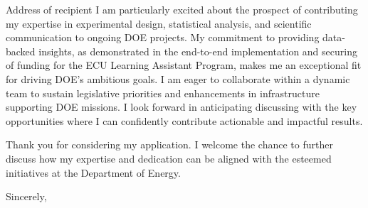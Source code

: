 \documentclass[12pt]{letter} %
\begin{document}
\begin{letter}{ Address of recipient }
  I am particularly excited about the prospect of contributing my expertise in experimental
  design, statistical analysis, and scientific communication to ongoing DOE projects. My
  commitment to providing data-backed insights, as demonstrated in the end-to-end
  implementation and securing of funding for the ECU Learning Assistant Program, makes me an
  exceptional fit for driving DOE's ambitious goals. I am eager to collaborate within a dynamic
  team to sustain legislative priorities and enhancements in infrastructure supporting DOE
  missions. I look forward in anticipating discussing with the key opportunities where I can
  confidently contribute actionable and impactful results.

  Thank you for considering my application. I welcome the chance to further discuss how my
  expertise and dedication can be aligned with the esteemed initiatives at the Department of
  Energy.

  \closing{Sincerely,}


  \vfill
  
\end{letter}
\end{document}

